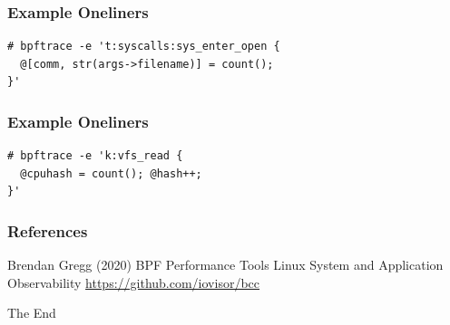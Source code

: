 \documentclass{beamer}
\begin{document}
\begin{frame}[fragile] %
\frametitle{Example Oneliners}
\begin{example}
\begin{verbatim}
# bpftrace -e 't:syscalls:sys_enter_open { 
  @[comm, str(args->filename)] = count();
}'
\end{verbatim}
\end{example}
\end{frame}


\begin{frame}[fragile] %
\frametitle{Example Oneliners}
\begin{example}[Concurrency]
\begin{verbatim}
# bpftrace -e 'k:vfs_read { 
  @cpuhash = count(); @hash++; 
}'
\end{verbatim}
\end{example}
\end{frame}


\begin{frame}
\frametitle{References}
\footnotesize{
\begin{thebibliography}{99} %
 Brendan Gregg (2020)
\newblock BPF Performance Tools
\newblock Linux System and Application Observability
 \url{https://github.com/iovisor/bcc}
\end{thebibliography}
}
\end{frame}


\begin{frame}
\Huge{\centerline{The End}}
\end{frame}

\end{document}

